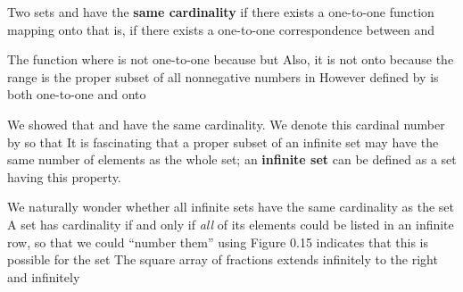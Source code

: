 \documentclass[11pt,oneside]{article}
\begin{document}
\begin{BookBody}
 Two sets  and  have the\textbf{ same cardinality} if there exists a one-to-one function mapping  onto  that is, if there exists a one-to-one correspondence between  and  \BookEnd{\blacksquare}

 The function  where  is not one-to-one because  but  Also, it is not onto  because the range is the proper subset of all nonnegative numbers in  However defined by  is both one-to-one and onto \BookEnd{\blacktriangle}

We showed that  and  have the same cardinality. We denote this cardinal number by  so that  It is fascinating that a proper subset of an infinite set may have the same number of elements as the whole set; an\textbf{ infinite set} can be defined as a set having this property.

We naturally wonder whether all infinite sets have the same cardinality as the set  A set has cardinality  if and only if\textit{ all} of its elements could be listed in an infinite row, so that we could “number them” using  Figure 0.15 indicates that this is possible for the set  The square array of fractions extends infinitely to the right and infinitely

\end{BookBody}

\BookNarrativetrue
\end{document}
